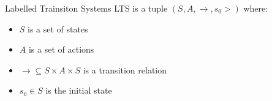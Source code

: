 \documentclass{beamer}
\begin{document}
  \begin{frame}{Labelled Trainsiton Systems}
    LTS is a tuple $(S, A, \to,s_0>)$ where: \\[12pt]
    \begin{itemize}
      \item $S$ is a set of states \\
      \item $A$ is a set of actions \\
      \item $\to \subseteq S \times A \times S$ is a transition relation \\
      \item $s_0 \in S$ is the initial state \\
    \end{itemize}
  \end{frame}
\end{document}
